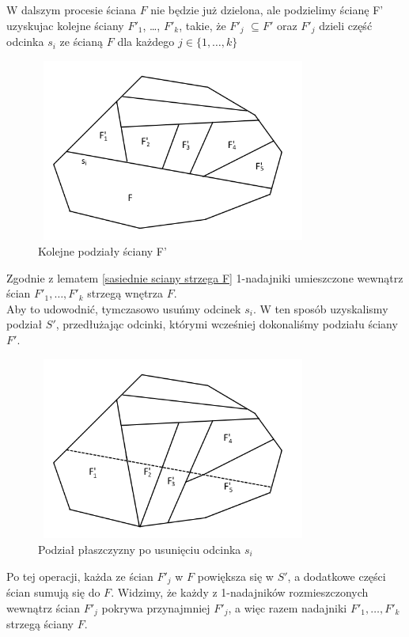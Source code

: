 \documentclass[brudnopis]{xmgr}
\begin{document}
W dalszym procesie ściana $F$ nie będzie już dzielona, ale podzielimy ścianę F' uzyskujac kolejne ściany $F'_1$, \ldots, $F'_k$, takie, że $F'_j$ $\subseteq F'$ oraz $F'_j$ dzieli część odcinka $s_i$ ze ścianą $F$ dla każdego $j \in \{1,\ldots,k\}$

\begin{figure}[ht!]
  \centering
  \label{podzial F' na kolejne ściany}
  \includegraphics[width=9cm,height=6cm]{rysunki/podzial_F'.png}
  \caption{Kolejne podziały ściany F'}
\end{figure} 
Zgodnie z lematem \ref{sasiednie sciany strzega F} 1-nadajniki umieszczone wewnątrz ścian $F'_1, \ldots, F'_k$ strzegą wnętrza $F$. 
\\Aby to udowodnić, tymczasowo usuńmy odcinek $s_i$. W ten sposób uzyskalismy podział $S'$, przedłużając odcinki, którymi wcześniej dokonaliśmy podziału ściany $F'$.

\begin{figure}[ht!]
  \centering
  \label{podzial po usunieciu si}
  \includegraphics[width=9cm,height=6cm]{rysunki/usuniete_si.png}
  \caption{Podział płaszczyzny po usunięciu odcinka $s_i$}
\end{figure} 

Po tej operacji, każda ze ścian $F'_j$ w $F$ powiększa się w $S'$, a dodatkowe części ścian sumują się do $F$. Widzimy, że każdy z 1-nadajników rozmieszczonych wewnątrz ścian $F'_j$ pokrywa przynajmniej $F'_j$, a więc razem nadajniki $F'_1,\ldots,F'_k$ strzegą ściany $F$.
\end{document}
